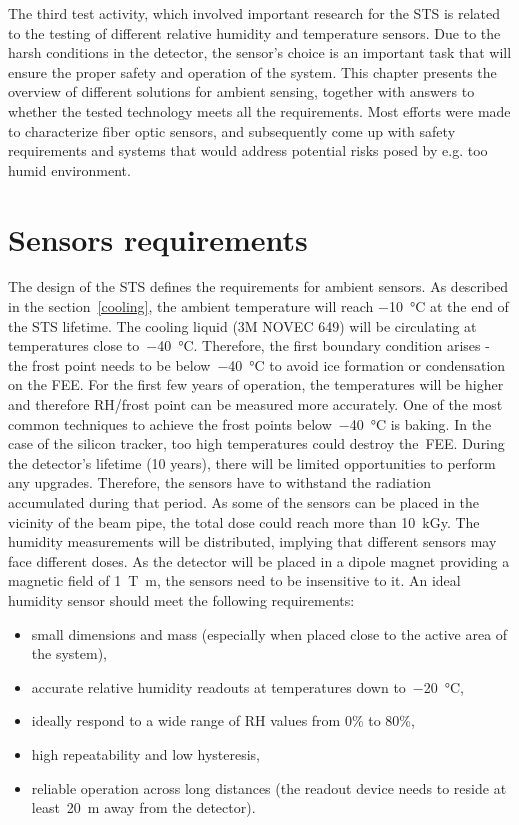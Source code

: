 The third test activity, which involved important research for the \gls{STS} is related to the testing of different relative humidity and temperature sensors. Due to the harsh conditions in the detector, the sensor's choice is an important task that will ensure the proper safety and operation of the system. This chapter presents the overview of different solutions for ambient sensing, together with answers to whether the tested technology meets all the requirements. Most efforts were made to characterize fiber optic sensors, and subsequently come up with safety requirements and systems that would address potential risks posed by e.g. too humid environment. 

\section{Sensors requirements}

The design of the \gls{STS} \cite{Heuser:54798} defines the requirements for ambient sensors. As described in the section~\ref{cooling}, the ambient temperature will reach \SI{-10}{\celsius} at the end of the \gls{STS} lifetime. The cooling liquid (3M NOVEC 649) will be circulating at temperatures close to~\SI{-40}{\celsius}. Therefore, the first boundary condition arises - the frost point needs to be below~\SI{-40}{\celsius} to avoid ice formation or condensation on the \gls{FEE}. For the first few years of operation, the temperatures will be higher and therefore RH/frost point can be measured more accurately. One of the most common techniques to achieve the frost points below~\SI{-40}{\celsius} is baking. In the case of the silicon tracker, too high temperatures could destroy the~\gls{FEE}. 
During the detector's lifetime (10 years), there will be limited opportunities to perform any upgrades. Therefore, the sensors have to withstand the radiation accumulated during that period. As some of the sensors can be placed in the vicinity of the beam pipe, the total dose could reach more than 10~kGy. The humidity measurements will be distributed, implying that different sensors may face different doses. As the detector will be placed in a dipole magnet providing a magnetic field of \SI{1}{\tesla\metre}, the sensors need to be insensitive to it. An ideal humidity sensor should meet the following requirements:
\begin{itemize}
    \item small dimensions and mass (especially when placed close to the active area of the system),
    \item accurate relative humidity readouts at temperatures down to~\SI{-20}{\celsius}, 
    \item ideally respond to a wide range of \gls{RH} values from 0\% to 80\%,
    \item high repeatability and low hysteresis,
    \item reliable operation across long distances (the readout device needs to reside at least~\SI{20}{\metre} away from the detector).
\end{itemize}

